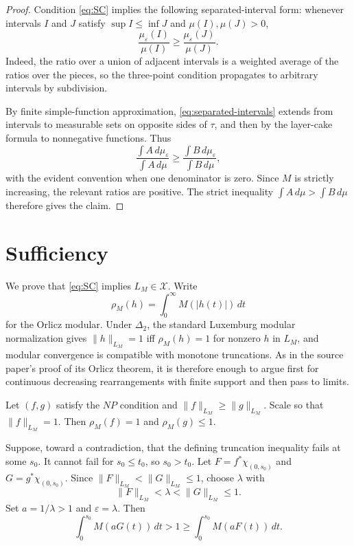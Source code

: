 \documentclass[11pt]{article}
\newcommand{\Xclass}{\mathcal X}
\newcommand{\rhoM}{\rho_M}
\newcommand{\eps}{\varepsilon}
\begin{document}
\begin{proof}
Condition \eqref{eq:SC} implies the following separated-interval form: whenever
intervals $I$ and $J$ satisfy $\sup I\le \inf J$ and $\mu(I),\mu(J)>0$,
\[
 \frac{\mu_\eps(I)}{\mu(I)}\ge
 \frac{\mu_\eps(J)}{\mu(J)}.
\tag{1}
\label{eq:separated-intervals}
\]
Indeed, the ratio over a union of adjacent intervals is a weighted average of
the ratios over the pieces, so the three-point condition propagates to
arbitrary intervals by subdivision.

By finite simple-function approximation, \eqref{eq:separated-intervals}
extends from intervals to measurable sets on opposite sides of $\tau$, and
then by the layer-cake formula to nonnegative functions. Thus
\[
 \frac{\int A\,d\mu_\eps}{\int A\,d\mu}
 \ge
 \frac{\int B\,d\mu_\eps}{\int B\,d\mu},
\]
with the evident convention when one denominator is zero. Since
$M$ is strictly increasing, the relevant ratios are positive. The strict
inequality $\int A\,d\mu>\int B\,d\mu$ therefore gives the claim.
\end{proof}

\section*{Sufficiency}

We prove that \eqref{eq:SC} implies $L_M\in\Xclass$. Write
\[
 \rhoM(h)=\int_0^\infty M(|h(t)|)\,dt
\]
for the Orlicz modular. Under $\Delta_2$, the standard Luxemburg modular
normalization gives $\|h\|_{L_M}=1$ iff $\rhoM(h)=1$ for nonzero $h$ in
$L_M$, and modular convergence is compatible with monotone truncations. As in
the source paper's proof of its Orlicz theorem, it is therefore enough to
argue first for continuous decreasing rearrangements with finite support and
then pass to limits.

Let $(f,g)$ satisfy the $NP$ condition and $\|f\|_{L_M}\ge \|g\|_{L_M}$. Scale
so that $\|f\|_{L_M}=1$. Then $\rhoM(f)=1$ and $\rhoM(g)\le 1$.

Suppose, toward a contradiction, that the defining truncation inequality fails
at some $s_0$. It cannot fail for $s_0\le t_0$, so $s_0>t_0$. Let
$F=f^*\chi_{(0,s_0)}$ and $G=g^*\chi_{(0,s_0)}$. Since
$\|F\|_{L_M}<\|G\|_{L_M}\le 1$, choose $\lambda$ with
\[
 \|F\|_{L_M}<\lambda<\|G\|_{L_M}\le 1.
\]
Set $a=1/\lambda>1$ and $\eps=\lambda$. Then
\[
 \int_0^{s_0} M(aG(t))\,dt>1\ge
 \int_0^{s_0} M(aF(t))\,dt.
\tag{2}
\label{eq:high-scale-prefix}
\]
\end{document}

